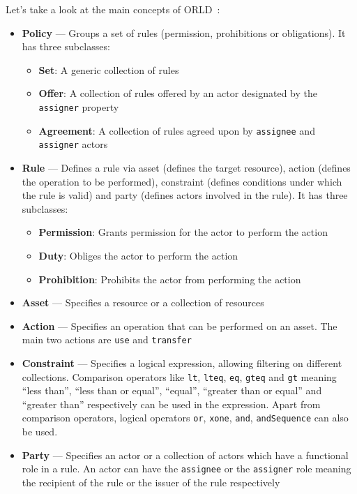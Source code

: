 Let's take a look at the main concepts of ORLD~\cite{gaiax_data_exchange_document}:
\begin{itemize}
    \item \textbf{Policy} --- Groups a set of rules (permission, prohibitions or obligations).
    It has three subclasses:
    \begin{itemize}
        \item \textbf{Set}: A generic collection of rules
        \item \textbf{Offer}: A collection of rules offered by an actor designated by the \texttt{assigner} property
        \item \textbf{Agreement}: A collection of rules agreed upon by \texttt{assignee} and \texttt{assigner} actors
    \end{itemize}
    \item \textbf{Rule} --- Defines a rule via asset (defines the target resource), action (defines the operation to be performed), constraint (defines conditions under which the rule is valid) and party (defines actors involved in the rule).
    It has three subclasses:
    \begin{itemize}
        \item \textbf{Permission}: Grants permission for the actor to perform the action
        \item \textbf{Duty}: Obliges the actor to perform the action
        \item \textbf{Prohibition}: Prohibits the actor from performing the action
    \end{itemize}
    \item \textbf{Asset} --- Specifies a resource or a collection of resources
    \item \textbf{Action} --- Specifies an operation that can be performed on an asset.
    The main two actions are \texttt{use} and \texttt{transfer}
    \item \textbf{Constraint} --- Specifies a logical expression, allowing filtering on different collections.
    Comparison operators like \texttt{lt}, \texttt{lteq}, \texttt{eq}, \texttt{gteq} and \texttt{gt} meaning ``less than'', ``less than or equal'', ``equal'', ``greater than or equal'' and ``greater than'' respectively can be used in the expression.
    Apart from comparison operators, logical operators \texttt{or}, \texttt{xone}, \texttt{and}, \texttt{andSequence} can also be used.
    \item \textbf{Party} --- Specifies an actor or a collection of actors which have a functional role in a rule.
    An actor can have the \texttt{assignee} or the \texttt{assigner} role meaning the recipient of the rule or the issuer of the rule respectively
\end{itemize}

